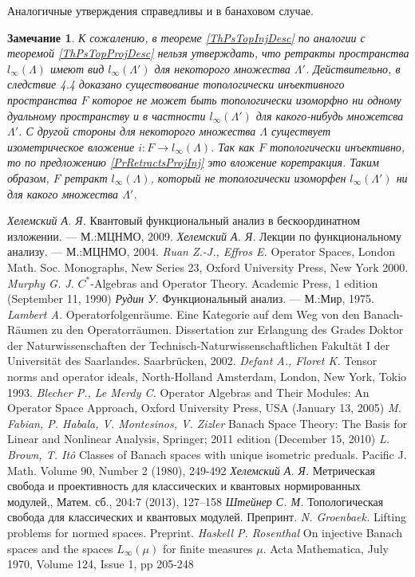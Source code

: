 \documentclass[12pt]{article}
\newtheorem{remark}[theorem]{Замечание}
\begin{document}
Аналогичные утверждения справедливы и в банаховом случае.

\begin{remark} К сожалению, в теореме \ref{ThPsTopInjDesc} по аналогии с теоремой \ref{ThPsTopProjDesc} нельзя утверждать, что ретракты пространства $l_\infty(\Lambda)$ имеют вид $l_\infty(\Lambda')$ для некоторого множества $\Lambda'$. Действительно, в \cite{RosInjLmuSp} следствие 4.4 доказано существование топологически инъективного пространства $F$ которое не может быть топологически изоморфно ни одному дуальному пространству и в частности $l_\infty(\Lambda')$ для какого-нибудь множетсва $\Lambda'$. С другой стороны для некоторого множества $\Lambda$ существует изометрическое вложение $i:F\to l_\infty(\Lambda)$. Так как $F$ топологически инъективно, то по предложению \ref{PrRetractsProjInj} это вложение коретракция. Таким образом, $F$ ретракт $l_\infty(\Lambda)$, который не топологически изоморфен $l_\infty(\Lambda')$ ни для какого множества $\Lambda'$.
\end{remark}


\newpage
\begin{thebibliography}{999}
\textit{Хелемский А. Я.} Квантовый функциональный анализ в бескоординатном изложении. — М.:МЦНМО, 2009.
\textit{Хелемский А. Я.} Лекции по функциональному анализу. — М.:МЦНМО, 2004.
\textit{Ruan Z.-J., Effros E.} Operator Spaces, London Math. Soc. Monographs, New Series 23, Oxford University Press, New York 2000. 
\textit{Murphy G. J.} $C^*$-Algebras and Operator Theory. Academic Press, 1 edition (September 11, 1990)
\textit{Рудин У.} Функциональный анализ. — М.:Мир, 1975.
\textit{Lambert A.} Operatorfolgenr\"{a}ume. Eine Kategorie auf dem Weg von den Banach-R\"{a}umen zu den Operatorr\"{a}umen. Dissertation zur Erlangung des Grades Doktor der Naturwissenschaften der Technisch-Naturwissenschaftlichen Fakult\"{a}t I der Universit\"{a}t des Saarlandes. Saarbr\"{u}cken, 2002.
\textit{Defant A., Floret K.} Tensor norms and operator ideals, North-Holland Amsterdam,
London, New York, Tokio 1993.
\textit{Blecher P., Le Merdy C.} Operator Algebras and Their Modules: An Operator Space Approach, Oxford University Press, USA (January 13, 2005)
\textit{M. Fabian, P. Habala, V. Montesinos, V. Zizler} Banach Space Theory: The Basis for Linear and Nonlinear Analysis, Springer; 2011 edition (December 15, 2010)
\textit{L. Brown, T. Itô} Classes of Banach spaces with unique isometric preduals. Pacific J. Math. Volume 90, Number 2 (1980), 249-492
\textit{Хелемский А. Я.} Метрическая свобода и проективность для классических и квантовых нормированных модулей,, Матем. сб., 204:7 (2013), 127–158 
\textit{Штейнер С. М.} Топологическая свобода для классических и квантовых модулей. Препринт.
\textit{N. Groenbaek.} Lifting problems for normed spaces. Preprint.
\textit{Haskell P. Rosenthal} On injective Banach spaces and the spaces $L_\infty(\mu)$ for finite measures $\mu$. Acta Mathematica, July 1970, Volume 124, Issue 1, pp 205-248
\end{thebibliography}
\end{document}
